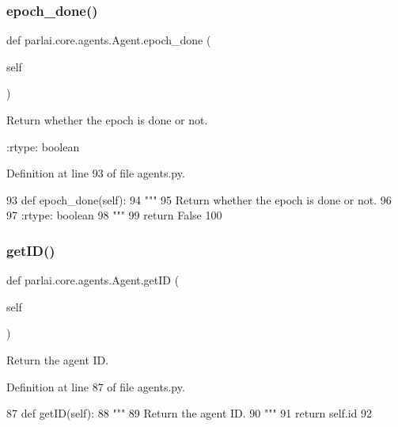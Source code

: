 \subsubsection{\texorpdfstring{epoch\+\_\+done()}{epoch\_done()}}
{\footnotesize\ttfamily def parlai.\+core.\+agents.\+Agent.\+epoch\+\_\+done (\begin{DoxyParamCaption}\item[{}]{self }\end{DoxyParamCaption})}

\begin{DoxyVerb}Return whether the epoch is done or not.

:rtype: boolean
\end{DoxyVerb}
 

Definition at line 93 of file agents.\+py.


\begin{DoxyCode}
93     \textcolor{keyword}{def }epoch\_done(self):
94         \textcolor{stringliteral}{"""}
95 \textcolor{stringliteral}{        Return whether the epoch is done or not.}
96 \textcolor{stringliteral}{}
97 \textcolor{stringliteral}{        :rtype: boolean}
98 \textcolor{stringliteral}{        """}
99         \textcolor{keywordflow}{return} \textcolor{keyword}{False}
100 
\end{DoxyCode}
\mbox{\label{classparlai_1_1core_1_1agents_1_1Agent_a29e1cdd729ac4236f8bae90b2e66fa04}} 
\subsubsection{\texorpdfstring{get\+I\+D()}{getID()}}
{\footnotesize\ttfamily def parlai.\+core.\+agents.\+Agent.\+get\+ID (\begin{DoxyParamCaption}\item[{}]{self }\end{DoxyParamCaption})}

\begin{DoxyVerb}Return the agent ID.
\end{DoxyVerb}
 

Definition at line 87 of file agents.\+py.


\begin{DoxyCode}
87     \textcolor{keyword}{def }getID(self):
88         \textcolor{stringliteral}{"""}
89 \textcolor{stringliteral}{        Return the agent ID.}
90 \textcolor{stringliteral}{        """}
91         \textcolor{keywordflow}{return} self.id
92 
\end{DoxyCode}
\mbox{\label{classparlai_1_1core_1_1agents_1_1Agent_a98041e2d186aa81bd5e1649a91f623bc}} 

